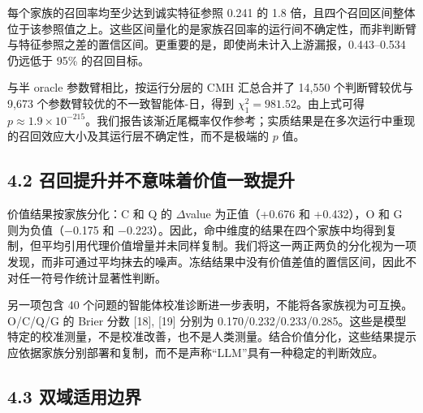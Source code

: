 \documentclass[
  chinese,
  conference,10pt]{IEEEtran}
\begin{document}
每个家族的召回率均至少达到诚实特征参照 0.241 的 1.8 倍，且四个召回区间整体位于该参照值之上。这些区间量化的是家族召回率的运行间不确定性，而非判断臂与特征参照之差的置信区间。更重要的是，即使尚未计入上游漏报，0.443--0.534 仍远低于 95\% 的召回目标。

与半 oracle 参数臂相比，按运行分层的 CMH 汇总合并了 14,550 个判断臂较优与 9,673 个参数臂较优的不一致智能体-日，得到 \(\chi^2_1=981.52\)。由上式可得 \(p\approx1.9\times10^{-215}\)。我们报告该渐近尾概率仅作参考；实质结果是在多次运行中重现的召回效应大小及其运行层不确定性，而不是极端的 \(p\) 值。

\subsection{4.2 召回提升并不意味着价值一致提升}\label{ux53ecux56deux63d0ux5347ux5e76ux4e0dux610fux5473ux7740ux4ef7ux503cux4e00ux81f4ux63d0ux5347}

价值结果按家族分化：C 和 Q 的 \(\Delta\)value 为正值（+0.676 和 +0.432），O 和 G 则为负值（−0.175 和 −0.223）。因此，命中维度的结果在四个家族中均得到复制，但平均引用代理价值增量并未同样复制。我们将这一两正两负的分化视为一项发现，而非可通过平均抹去的噪声。冻结结果中没有价值差值的置信区间，因此不对任一符号作统计显著性判断。

另一项包含 40 个问题的智能体校准诊断进一步表明，不能将各家族视为可互换。O/C/Q/G 的 Brier 分数 {[}18{]}, {[}19{]} 分别为 0.170/0.232/0.233/0.285。这些是模型特定的校准测量，不是校准改善，也不是人类测量。结合价值分化，这些结果提示应依据家族分别部署和复制，而不是声称``LLM''具有一种稳定的判断效应。

\subsection{4.3 双域适用边界}\label{ux53ccux57dfux9002ux7528ux8fb9ux754c}
\end{document}
